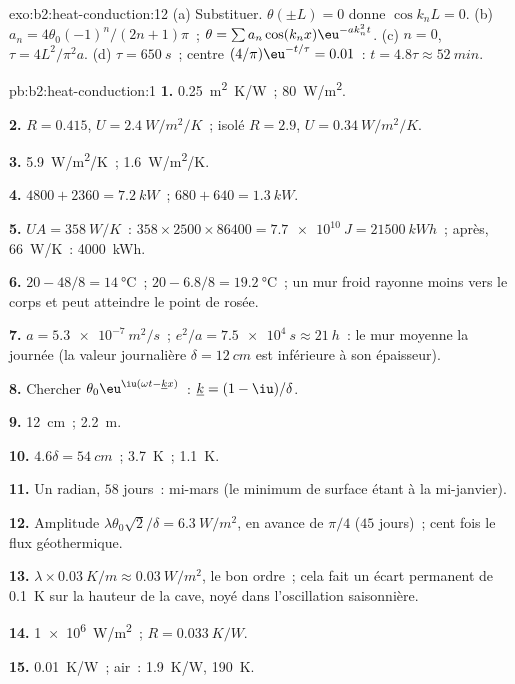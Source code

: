\begin{solution}{exo:b2:heat-conduction:12}
(a) Substituer. $\theta(\pm L) = 0$ donne $\cos k_nL = 0$. (b) $a_n =
4\theta_0(-1)^n/(2n+1)\pi$~; $\theta = \sum a_n\cos(k_nx)\eu^{-ak_n^2t}$. (c) $n = 0$,
$\tau = 4L^2/\pi^2a$. (d) $\tau = \qty{650}{s}$~; centre $(4/\pi)\eu^{-t/\tau} = 0.01$~:
$t = 4.8\tau \approx \qty{52}{min}$.
\end{solution}

\begin{solution}{pb:b2:heat-conduction:1}
\textbf{1.} \qty{0.25}{m^2.K/W}~; \qty{80}{W/m^2}.

\textbf{2.} $R = 0.415$, $U = \qty{2.4}{W/m^2/K}$~; isolé $R = 2.9$, $U =
\qty{0.34}{W/m^2/K}$.

\textbf{3.} \qty{5.9}{W/m^2/K}~; \qty{1.6}{W/m^2/K}.

\textbf{4.} $4800 + 2360 = \qty{7.2}{kW}$~; $680 + 640 = \qty{1.3}{kW}$.

\textbf{5.} $UA = \qty{358}{W/K}$~: $358 \times 2500 \times 86400 = \qty{7.7e10}{J} =
\qty{21500}{kWh}$~; après, \qty{66}{W/K}~: \qty{4000}{kWh}.

\textbf{6.} $20 - 48/8 = \qty{14}{\celsius}$~; $20 - 6.8/8 = \qty{19.2}{\celsius}$~;
un mur froid rayonne moins vers le corps et peut atteindre le point de rosée.

\textbf{7.} $a = \qty{5.3e-7}{m^2/s}$~; $e^2/a = \qty{7.5e4}{s} \approx \qty{21}{h}$~: le
mur moyenne la journée (la valeur journalière $\delta = \qty{12}{cm}$ est inférieure
à son épaisseur).

\textbf{8.} Chercher $\theta_0\eu^{\iu(\omega t - \underline kx)}$~: $\underline k = (1 - \iu)/\delta$.

\textbf{9.} \qty{12}{cm}~; \qty{2.2}{m}.

\textbf{10.} $4.6\delta = \qty{54}{cm}$~; \qty{3.7}{K}~; \qty{1.1}{K}.

\textbf{11.} Un radian, $58$ jours~: mi-mars (le minimum de surface
étant à la mi-janvier).

\textbf{12.} Amplitude $\lambda\theta_0\sqrt2/\delta = \qty{6.3}{W/m^2}$, en avance de
$\pi/4$ ($45$ jours)~; cent fois le flux géothermique.

\textbf{13.} $\lambda \times \qty{0.03}{K/m} \approx \qty{0.03}{W/m^2}$, le bon ordre~; cela
fait un écart permanent de \qty{0.1}{K} sur la hauteur de la cave, noyé dans
l'oscillation saisonnière.

\textbf{14.} \qty{1e6}{W/m^2}~; $R = \qty{0.033}{K/W}$.

\textbf{15.} \qty{0.01}{K/W}~; air~: \qty{1.9}{K/W}, \qty{190}{K}.


\end{solution}

